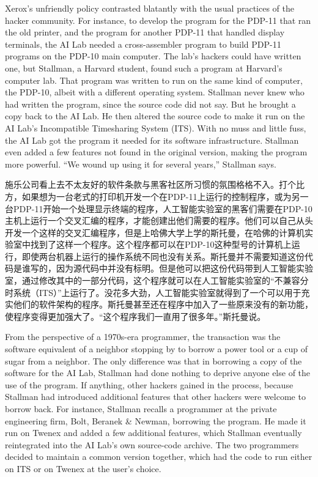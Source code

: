\ifdefined\eng
Xerox's unfriendly policy contrasted blatantly with the usual practices of the hacker community.  For instance, to develop the program for the PDP-11 that ran the old printer, and the program for another PDP-11 that handled display terminals, the AI Lab needed a cross-assembler program to build PDP-11 programs on the PDP-10 main computer. The lab's hackers could have written one, but Stallman, a Harvard student, found such a program at Harvard's computer lab. That program was written to run on the same kind of computer, the PDP-10, albeit with a different operating system. Stallman never knew who had written the program, since the source code did not say.  But he brought a copy back to the AI Lab. He then altered the source code to make it run on the AI Lab's Incompatible Timesharing System (ITS). With no muss and little fuss, the AI Lab got the program it needed for its software infrastructure. Stallman even added a few features not found in the original version, making the program more powerful. ``We wound up using it for several years,'' Stallman says.
\fi

\ifdefined\chs
施乐公司看上去不太友好的软件条款与黑客社区所习惯的氛围格格不入。打个比方，如果想为一台老式的打印机开发一个在PDP-11上运行的控制程序，或为另一台PDP-11开始一个处理显示终端的程序，人工智能实验室的黑客们需要在PDP-10主机上运行一个交叉汇编的程序，才能创建出他们需要的程序。他们可以自己从头开发一个这样的交叉汇编程序，但是上哈佛大学上学的斯托曼，在哈佛的计算机实验室中找到了这样一个程序。这个程序都可以在PDP-10这种型号的计算机上运行，即使两台机器上运行的操作系统不同也没有关系。斯托曼并不需要知道这份代码是谁写的，因为源代码中并没有标明。但是他可以把这份代码带到人工智能实验室，通过修改其中的一部分代码，这个程序就可以在人工智能实验室的“不兼容分时系统（ITS）”上运行了。没花多大劲，人工智能实验室就得到了一个可以用于充实他们的软件架构的程序。斯托曼甚至还在程序中加入了一些原来没有的新功能，使程序变得更加强大了。“这个程序我们一直用了很多年。”斯托曼说。
\fi

\ifdefined\eng
From the perspective of a 1970s-era programmer, the transaction was the software equivalent of a neighbor stopping by to borrow a power tool or a cup of sugar from a neighbor. The only difference was that in borrowing a copy of the software for the AI Lab, Stallman had done nothing to deprive anyone else of the use of the program. If anything, other hackers gained in the process, because Stallman had introduced additional features that other hackers were welcome to borrow back.  For instance, Stallman recalls a programmer at the private engineering firm, Bolt, Beranek \& Newman, borrowing the program. He made it run on Twenex and added a few additional features, which Stallman eventually reintegrated into the AI Lab's own source-code archive.  The two programmers decided to maintain a common version together, which had the code to run either on ITS or on Twenex at the user's choice.
\fi

